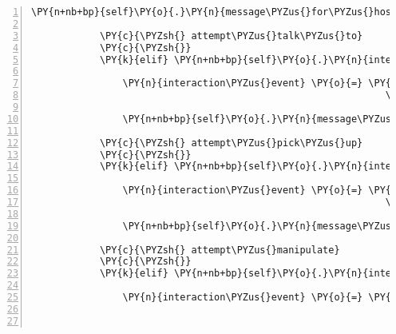 \begin{Verbatim}[commandchars=\\\{\},numbers=left,firstnumber=1,stepnumber=1]
                \PY{n+nb+bp}{self}\PY{o}{.}\PY{n}{message\PYZus{}for\PYZus{}host}\PY{o}{.}\PY{n}{event\PYZus{}list}\PY{o}{.}\PY{n}{append}\PY{p}{(}\PY{n}{interaction\PYZus{}event}\PY{p}{)}

            \PY{c}{\PYZsh{} attempt\PYZus{}talk\PYZus{}to}
            \PY{c}{\PYZsh{}}
            \PY{k}{elif} \PY{n+nb+bp}{self}\PY{o}{.}\PY{n}{interaction\PYZus{}sound\PYZus{}menu}\PY{o}{.}\PY{n}{list\PYZus{}index} \PY{o}{==} \PY{n+nb+bp}{self}\PY{o}{.}\PY{n}{ATTEMPT\PYZus{}TALK\PYZus{}TO}\PY{p}{:}

                \PY{n}{interaction\PYZus{}event} \PY{o}{=} \PY{n}{fabula}\PY{o}{.}\PY{n}{TriesToTalkToEvent}\PY{p}{(}\PY{n+nb+bp}{self}\PY{o}{.}\PY{n}{host}\PY{o}{.}\PY{n}{client\PYZus{}id}\PY{p}{,}
                                                              \PY{n}{selected\PYZus{}target}\PY{p}{)}

                \PY{n+nb+bp}{self}\PY{o}{.}\PY{n}{message\PYZus{}for\PYZus{}host}\PY{o}{.}\PY{n}{event\PYZus{}list}\PY{o}{.}\PY{n}{append}\PY{p}{(}\PY{n}{interaction\PYZus{}event}\PY{p}{)}

            \PY{c}{\PYZsh{} attempt\PYZus{}pick\PYZus{}up}
            \PY{c}{\PYZsh{}}
            \PY{k}{elif} \PY{n+nb+bp}{self}\PY{o}{.}\PY{n}{interaction\PYZus{}sound\PYZus{}menu}\PY{o}{.}\PY{n}{list\PYZus{}index} \PY{o}{==} \PY{n+nb+bp}{self}\PY{o}{.}\PY{n}{ATTEMPT\PYZus{}PICK\PYZus{}UP}\PY{p}{:}

                \PY{n}{interaction\PYZus{}event} \PY{o}{=} \PY{n}{fabula}\PY{o}{.}\PY{n}{TriesToPickUpEvent}\PY{p}{(}\PY{n+nb+bp}{self}\PY{o}{.}\PY{n}{host}\PY{o}{.}\PY{n}{client\PYZus{}id}\PY{p}{,}
                                                              \PY{n}{selected\PYZus{}target}\PY{p}{)}

                \PY{n+nb+bp}{self}\PY{o}{.}\PY{n}{message\PYZus{}for\PYZus{}host}\PY{o}{.}\PY{n}{event\PYZus{}list}\PY{o}{.}\PY{n}{append}\PY{p}{(}\PY{n}{interaction\PYZus{}event}\PY{p}{)}

            \PY{c}{\PYZsh{} attempt\PYZus{}manipulate}
            \PY{c}{\PYZsh{}}
            \PY{k}{elif} \PY{n+nb+bp}{self}\PY{o}{.}\PY{n}{interaction\PYZus{}sound\PYZus{}menu}\PY{o}{.}\PY{n}{list\PYZus{}index} \PY{o}{==} \PY{n+nb+bp}{self}\PY{o}{.}\PY{n}{ATTEMPT\PYZus{}MANIPULATE}\PY{p}{:}

                \PY{n}{interaction\PYZus{}event} \PY{o}{=} \PY{n}{fabula}\PY{o}{.}\PY{n}{TriesToManipulateEvent}\PY{p}{(}\PY{n+nb+bp}{self}\PY{o}{.}\PY{n}{host}\PY{o}{.}\PY{n}{client\PYZus{}id}\PY{p}{,}
                                                                  \PY{n}{selected\PYZus{}target}\PY{p}{)}


\end{Verbatim}
